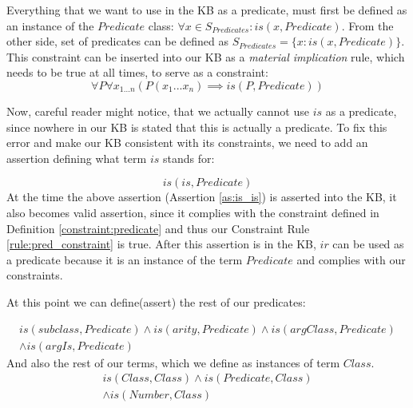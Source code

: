 \begin{definition}\label{constraint:predicate}
Everything that we want to use in the KB as a predicate, must first be defined
as an instance of the $Predicate$ class:
$\forall x \in S_{Predicates}: is(x,Predicate)$. From the other side, set of
predicates can be defined as $S_{Predicates}=\{x:is(x,Predicate)\}$.
This constraint can be inserted into our KB as a \emph{material implication}
rule, which needs to be true at all times, to serve as a constraint:
\begin{equation}\label{rule:pred_constraint}
\forall P \forall x_{1...n} (P(x_1...x_n) \implies is(P,Predicate))
\end{equation}
\end{definition}

Now, careful reader might notice, that we actually cannot use $is$ as a 
predicate, since nowhere in our KB is stated that this is actually a 
predicate. To fix this error and make our KB consistent with its constraints,
we need to add an assertion defining what term $is$ stands for:

\begin{equation}\label{as:is_is}
is(is, Predicate)
\end{equation}
At the time the above assertion (Assertion \ref{as:is_is}) is asserted
into the KB, it also becomes valid assertion, since it complies with the
constraint defined in Definition \autoref{constraint:predicate} and thus our
Constraint Rule \ref{rule:pred_constraint} is true. After this 
assertion is in the KB, $ir$ can be used as a predicate because it is an 
instance of the term $Predicate$ and complies with our constraints. 

At this point we can define(assert) the rest of our predicates:

\begin{equation}\label{as:predicates}
\begin{gathered}
is(subclass, Predicate) \land is(arity,Predicate) \land is(argClass,Predicate)\\
\land is(argIs,Predicate)
\end {gathered}
\end{equation}
And also the rest of our terms, which we define as instances of term $Class$.
\begin{equation}\label{as:is_class}
\begin{gathered}
	is(Class,Class) \land is(Predicate,Class)\\ 
\land is(Number, Class)
\end {gathered}
\end{equation}

